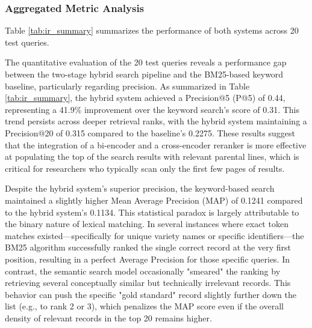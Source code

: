 \documentclass[journal]{./IEEE/IEEEtran}
\begin{document}
\subsubsection{Aggregated Metric Analysis}
Table \ref{tab:ir_summary} summarizes the performance of both systems across 20 test queries. 

\begin{table}[htbp]
\caption{Aggregated Information Retrieval Metrics}
\label{tab:ir_summary}
\centering
{}
\end{table}


The quantitative evaluation of the 20 test queries reveals a performance gap between the two-stage hybrid search pipeline and the BM25-based keyword baseline, particularly regarding precision. As summarized in Table \ref{tab:ir_summary}, the hybrid system achieved a Precision@5 (P@5) of 0.44, representing a 41.9\% improvement over the keyword search's score of 0.31. This trend persists across deeper retrieval ranks, with the hybrid system maintaining a Precision@20 of 0.315 compared to the baseline's 0.2275. These results suggest that the integration of a bi-encoder and a cross-encoder reranker is more effective at populating the top of the search results with relevant parental lines, which is critical for researchers who typically scan only the first few pages of results.

Despite the hybrid system’s superior precision, the keyword-based search maintained a slightly higher Mean Average Precision (MAP) of 0.1241 compared to the hybrid system’s 0.1134. This statistical paradox is largely attributable to the binary nature of lexical matching. In several instances where exact token matches existed—specifically for unique variety names or specific identifiers—the BM25 algorithm successfully ranked the single correct record at the very first position, resulting in a perfect Average Precision for those specific queries. In contrast, the semantic search model occasionally "smeared" the ranking by retrieving several conceptually similar but technically irrelevant records. This behavior can push the specific "gold standard" record slightly further down the list (e.g., to rank 2 or 3), which penalizes the MAP score even if the overall density of relevant records in the top 20 remains higher.
\end{document}
